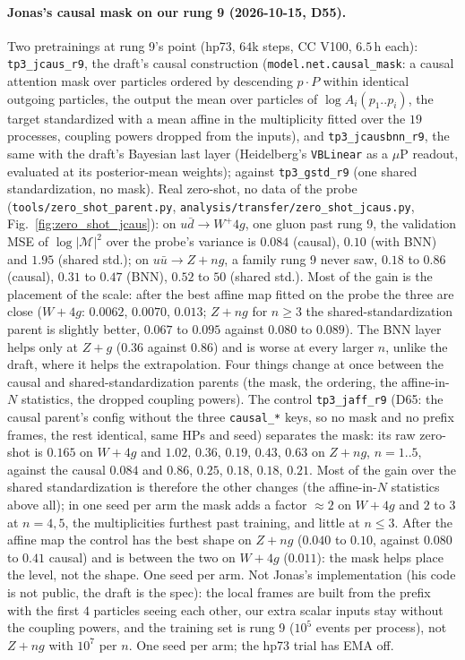 \documentclass[11pt]{article}
\newcommand{\code}[1]{\texttt{#1}}
\begin{document}
\paragraph{Jonas's causal mask on our rung 9 (2026-10-15, D55).}\label{sec:jcaus} Two pretrainings at rung 9's point
(hp73, $64$k steps, CC V100, $6.5$\,h each): \code{tp3\_jcaus\_r9}, the draft's causal construction
(\code{model.net.causal\_mask}: a causal attention mask over particles ordered by descending $p\cdot P$ within identical
outgoing particles, the output the mean over particles of $\log A_i(p_1..p_i)$, the target standardized with a mean
affine in the multiplicity fitted over the $19$ processes, coupling powers dropped from the inputs), and
\code{tp3\_jcausbnn\_r9}, the same with the draft's Bayesian last layer (Heidelberg's \code{VBLinear} as a $\mu$P readout,
evaluated at its posterior-mean weights); against \code{tp3\_gstd\_r9} (one shared standardization, no mask). Real
zero-shot, no data of the probe (\code{tools/zero\_shot\_parent.py}, \code{analysis/transfer/zero\_shot\_jcaus.py},
Fig.~\ref{fig:zero_shot_jcaus}): on $u\bar d\to W^+4g$, one gluon past rung 9, the validation MSE of $\log|\mathcal M|^2$
over the probe's variance is $0.084$ (causal), $0.10$ (with BNN) and $1.95$ (shared std.); on $u\bar u\to Z+ng$, a family
rung 9 never saw, $0.18$ to $0.86$ (causal), $0.31$ to $0.47$ (BNN), $0.52$ to $50$ (shared std.). Most of the gain is the
placement of the scale: after the best affine map fitted on the probe the three are close ($W{+}4g$: $0.0062$, $0.0070$,
$0.013$; $Z{+}ng$ for $n\ge3$ the shared-standardization parent is slightly better, $0.067$ to $0.095$ against $0.080$ to
$0.089$). The BNN layer helps only at $Z{+}g$ ($0.36$ against $0.86$) and is worse at every larger $n$, unlike the draft,
where it helps the extrapolation. Four things change at once between the causal and shared-standardization parents (the
mask, the ordering, the affine-in-$N$ statistics, the dropped coupling powers). The control \code{tp3\_jaff\_r9} (D65:
the causal parent's config without the three \code{causal\_*} keys, so no mask and no prefix frames, the rest identical,
same HPs and seed) separates the mask: its raw zero-shot is $0.165$ on $W{+}4g$ and $1.02$, $0.36$, $0.19$, $0.43$, $0.63$
on $Z{+}ng$, $n=1..5$, against the causal $0.084$ and $0.86$, $0.25$, $0.18$, $0.18$, $0.21$. Most of the gain over the
shared standardization is therefore the other changes (the affine-in-$N$ statistics above all); in one seed per arm the mask adds a factor
$\approx2$ on $W{+}4g$ and $2$ to $3$ at $n=4,5$, the multiplicities furthest past training, and little at $n\le3$. After
the affine map the control has the best shape on $Z{+}ng$ ($0.040$ to $0.10$, against $0.080$ to $0.41$ causal) and is
between the two on $W{+}4g$ ($0.011$): the mask helps place the level, not the shape. One seed per arm. Not Jonas's implementation (his code is not public, the
draft is the spec): the local frames are built from the prefix with the first $4$ particles seeing each other, our extra
scalar inputs stay without the coupling powers, and the training set is rung 9 ($10^5$ events per process), not $Z+ng$ with $10^7$ per $n$. One
seed per arm; the hp73 trial has EMA off.
\end{document}
